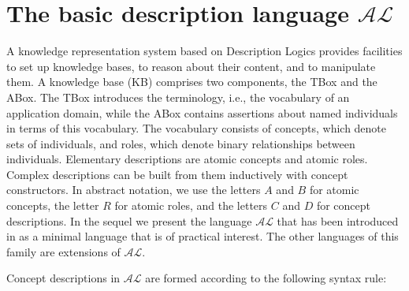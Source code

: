 \documentclass[a4paper, 11pt, oneside]{duthesis}
\newcommand{\al}{\mathcal{AL}}
\begin{document}
\newpage


%
%

\section{The basic description language $\al$}
A knowledge representation system based on Description Logics provides facilities to set up knowledge bases, to reason about their content, and to manipulate them.
A knowledge base (KB) comprises two components, the TBox and the ABox.
The TBox introduces the terminology, i.e., the vocabulary of an application domain, while the ABox contains assertions about named individuals in terms of this vocabulary.
The vocabulary consists of concepts, which denote sets of individuals, and roles, which denote binary relationships between individuals.
Elementary descriptions are atomic concepts and atomic roles.
Complex descriptions can be built from them inductively with concept constructors.
In abstract notation, we use the letters $A$ and $B$ for atomic concepts, the letter $R$ for atomic roles, and the letters $C$ and $D$ for concept descriptions.
In the sequel we present the language $\al$ that has been introduced in \cite{Schmidt-SchaubB:1991:ACD:114341.114342} as a minimal language that is of practical interest. The other languages of this family are extensions of $\al$.

Concept descriptions in $\al$ are formed according to the following syntax rule:
\end{document}
